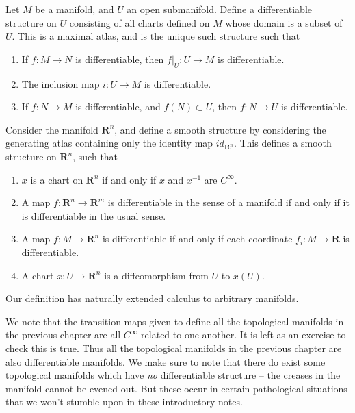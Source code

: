 \begin{example}
    Let $M$ be a manifold, and $U$ an open submanifold. Define a differentiable structure on $U$ consisting of all charts defined on $M$ whose domain is a subset of $U$. This is a maximal atlas, and is the unique such structure such that
    \begin{enumerate}
        \item If $f: M \to N$ is differentiable, then $f|_U: U \to M$ is differentiable.
        \item The inclusion map $i:U \to M$ is differentiable.
        \item If $f: N \to M$ is differentiable, and $f(N) \subset U$, then $f: N \to U$ is differentiable.
    \end{enumerate}
\end{example}

\begin{example}
    Consider the manifold $\mathbf{R}^n$, and define a smooth structure by considering the generating atlas containing only the identity map $id_{\mathbf{R}^n}$. This defines a smooth structure on $\mathbf{R}^n$, such that
    \begin{enumerate}
        \item $x$ is a chart on $\mathbf{R}^n$ if and only if $x$ and $x^{-1}$ are $C^\infty$.
        \item A map $f:\mathbf{R}^n \to \mathbf{R}^m$ is differentiable in the sense of a manifold if and only if it is differentiable in the usual sense.
        \item A map $f:M \to \mathbf{R}^n$ is differentiable if and only if each coordinate $f_i:M \to \mathbf{R}$ is differentiable.
        \item A chart $x:U \to \mathbf{R}^n$ is a diffeomorphism from $U$ to $x(U)$.
    \end{enumerate}
    Our definition has naturally extended calculus to arbitrary manifolds.
\end{example}

We note that the transition maps given to define all the topological manifolds in the previous chapter are all $C^\infty$ related to one another. It is left as an exercise to check this is true. Thus all the topological manifolds in the previous chapter are also differentiable manifolds. We make sure to note that there do exist some topological manifolds which have {\it no} differentiable structure -- the creases in the manifold cannot be evened out. But these occur in certain pathological situations that we won't stumble upon in these introductory notes.

